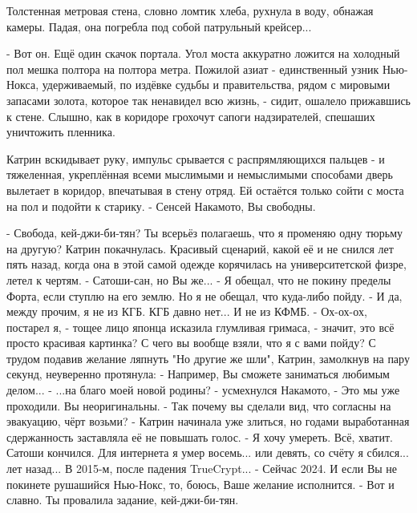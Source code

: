 Толстенная метровая стена, словно ломтик хлеба, рухнула в воду, обнажая камеры. Падая, она погребла под собой патрульный крейсер...

 - Вот он.
Ещё один скачок портала. Угол моста аккуратно ложится на холодный пол мешка полтора на полтора метра. Пожилой азиат - единственный узник Нью-Нокса, удерживаемый, по издёвке судьбы и правительства, рядом с мировыми запасами золота, которое так ненавидел всю жизнь, - сидит, ошалело прижавшись к стене. Слышно, как в коридоре грохочут сапоги надзирателей, спешаших уничтожить пленника.

Катрин вскидывает руку, импульс срывается с распрямляющихся пальцев - и тяжеленная, укреплённая всеми мыслимыми и немыслимыми способами дверь вылетает в коридор, впечатывая в стену отряд. Ей остаётся только сойти с моста на пол и подойти к старику.
 - Сенсей Накамото, Вы свободны.






- Свобода, кей-джи-би-тян? Ты всерьёз полагаешь, что я променяю одну тюрьму на другую?
Катрин покачнулась. Красивый сценарий, какой её и не снился лет пять назад, когда она в этой самой одежде корячилась на университетской физре, летел к чертям.
- Сатоши-сан, но Вы же...
- Я обещал, что не покину пределы Форта, если ступлю на его землю. Но я не обещал, что куда-либо пойду.
- И да, между прочим, я не из КГБ. КГБ давно нет... И не из КФМБ.
- Ох-ох-ох, постарел я, - тощее лицо японца исказила глумливая гримаса, - значит, это всё просто красивая картинка? С чего вы вообще взяли, что я с вами пойду?
С трудом подавив желание ляпнуть "Но другие же шли", Катрин, замолкнув на пару секунд, неуверенно протянула:
- Например, Вы сможете заниматься любимым делом...
- ...на благо моей новой родины? - усмехнулся Накамото, - Это мы уже проходили. Вы неоригинальны.
- Так почему вы сделали вид, что согласны на эвакуацию, чёрт возьми? - Катрин начинала уже злиться, но годами выработанная сдержанность заставляла её не повышать голос.
- Я хочу умереть. Всё, хватит. Сатоши кончился. Для интернета я умер восемь... или девять, со счёту я сбился... лет назад... В 2015-м, после падения TrueCrypt...
- Сейчас 2024. И если Вы не покинете рушашийся Нью-Нокс, то, боюсь, Ваше желание исполнится.
- Вот и славно. Ты провалила задание, кей-джи-би-тян.

